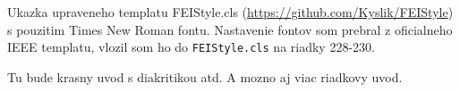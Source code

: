 Ukazka upraveneho templatu FEIStyle.cls (\url{https://github.com/Kyslik/FEIStyle}) s pouzitim Times New Roman fontu. Nastavenie fontov som prebral z oficialneho IEEE templatu, vlozil som ho do \texttt{FEIStyle.cls} na riadky 228-230. 

Tu bude krasny uvod s diakritikou atd. \newline A mozno aj viac riadkovy uvod.
